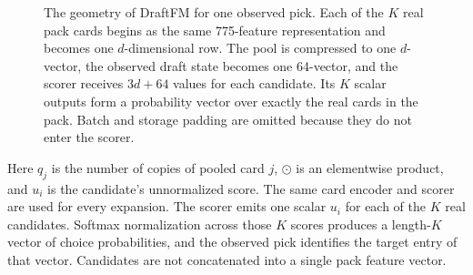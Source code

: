 \documentclass[11pt]{article}
\numberwithin{equation}{section}
\begin{document}
\begin{figure}[tb]
\caption{The geometry of DraftFM for one observed pick. Each of the $K$ real
pack cards begins as the same 775-feature representation and becomes one
$d$-dimensional row. The pool is compressed to one $d$-vector, the observed
draft state becomes one 64-vector, and the scorer receives $3d+64$ values for
each candidate. Its $K$ scalar outputs form a probability vector over exactly
the real cards in the pack. Batch and storage padding are omitted because they
do not enter the scorer.}
\label{fig:draftfm-architecture}
\end{figure}

Here $q_j$ is the number of copies of pooled card $j$, $\odot$ is an
elementwise product, and $u_i$ is the candidate's unnormalized score. The same
card encoder and scorer are used for every expansion. The scorer emits one
scalar $u_i$ for each of the $K$ real candidates. Softmax normalization across
those $K$ scores produces a length-$K$ vector of choice probabilities, and the
observed pick identifies the target entry of that vector. Candidates are not
concatenated into a single pack feature vector.
\end{document}
